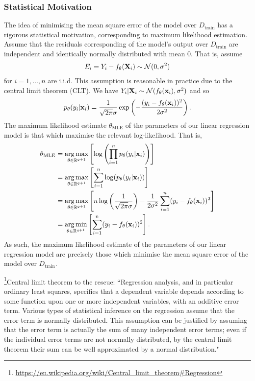 \documentclass[11pt]{article}
\begin{document}
\subsubsection{Statistical Motivation}

The idea of minimising the mean square error of the model over $D_{\text{train}}$ has a rigorous statistical motivation, corresponding to maximum likelihood estimation. Assume that the residuals corresponding of the model's output over $D_{\text{train}}$ are independent and identically normally distributed with mean 0. That is, assume
$$
E_i
=
Y_i-f_{\theta}(\mathbf{X}_i)\sim\mathcal{N}(0, \sigma^2)
$$
for $i=1,\dots,n$ are i.i.d. This assumption is reasonable in practice due to the central limit theorem (CLT). We have $Y_i|\mathbf{X}_i\sim\mathcal{N}(f_{\theta}(\mathbf{x}_i), \sigma^2)$ and so
$$
p_{\theta}(y_i|\mathbf{x}_i)=\frac{1}{\sqrt{2\pi}\sigma}\exp\left(-\frac{(y_i-f_{\theta}(\mathbf{x}_i))^2}{2\sigma^2}\right).
$$
The maximum likelihood estimate $\theta_{\text{MLE}}$ of the parameters of our linear regression model is that which maximise the relevant log-likelihood. That is,
\begin{align*}
    \theta_{\text{MLE}}
    &=
    \operatorname*{arg\,max}_{\theta\in\mathbb{R}^{q+1}}\left[\log\left(\prod_{i=1}^n p_{\theta}(y_i|\mathbf{x}_i)\right)\right]\\
    &=
    \operatorname*{arg\,max}_{\theta\in\mathbb{R}^{q+1}}\left[\sum_{i=1}^n\log(p_{\theta}(y_i|\mathbf{x}_i))\right]\\
    &=
    \operatorname*{arg\,max}_{\theta\in\mathbb{R}^{q+1}}\left[n\log\left(\frac{1}{\sqrt{2\pi}\sigma}\right)-\frac{1}{2\sigma^2}\sum_{i=1}^n(y_i-f_{\theta}(\mathbf{x}_i))^2\right]\\
    &=
    \operatorname*{arg\,min}_{\theta\in\mathbb{R}^{q+1}}\left[\sum_{i=1}^n(y_i-f_{\theta}(\mathbf{x}_i))^2\right].
\end{align*}
As such, the maximum likelihood estimate of the parameters of our linear regression model are precisely those which minimise the mean square error of the model over $D_{\text{train}}$.

\begin{tcolorbox}[title={\centering\textbf{Are residuals really normally distributed?}}, colback=myLightBlue, colbacktitle=myDarkBlue, colframe=myDarkBlue, coltitle=white]
    \footnote{\url{https://en.wikipedia.org/wiki/Central\_limit\_theorem\#Regression}}Central limit theorem to the rescue: ``Regression analysis, and in particular ordinary least squares, specifies that a dependent variable depends according to some function upon one or more independent variables, with an additive error term. Various types of statistical inference on the regression assume that the error term is normally distributed. This assumption can be justified by assuming that the error term is actually the sum of many independent error terms; even if the individual error terms are not normally distributed, by the central limit theorem their sum can be well approximated by a normal distribution."
\end{tcolorbox}
\end{document}
